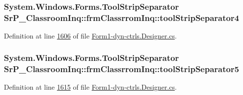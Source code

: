 \hypertarget{class_sr_p___classroom_inq_1_1frm_classrrom_inq_a4b694b6ce3670642d724af5e79c46031}{
\subsubsection[{tool\-Strip\-Separator4}]{\setlength{\rightskip}{0pt plus 5cm}\-System.\-Windows.\-Forms.\-Tool\-Strip\-Separator {\bf \-Sr\-P\-\_\-\-Classroom\-Inq\-::frm\-Classrrom\-Inq\-::tool\-Strip\-Separator4}}}
\label{class_sr_p___classroom_inq_1_1frm_classrrom_inq_a4b694b6ce3670642d724af5e79c46031}


\-Definition at line \hyperlink{_form1-dyn-ctrls_8_designer_8cs_source_l01606}{1606} of file \hyperlink{_form1-dyn-ctrls_8_designer_8cs_source}{\-Form1-\/dyn-\/ctrls.\-Designer.\-cs}.

\hypertarget{class_sr_p___classroom_inq_1_1frm_classrrom_inq_ae8424b2612bda51525d313c05df65bb0}{
\subsubsection[{tool\-Strip\-Separator5}]{\setlength{\rightskip}{0pt plus 5cm}\-System.\-Windows.\-Forms.\-Tool\-Strip\-Separator {\bf \-Sr\-P\-\_\-\-Classroom\-Inq\-::frm\-Classrrom\-Inq\-::tool\-Strip\-Separator5}}}
\label{class_sr_p___classroom_inq_1_1frm_classrrom_inq_ae8424b2612bda51525d313c05df65bb0}


\-Definition at line \hyperlink{_form1-dyn-ctrls_8_designer_8cs_source_l01615}{1615} of file \hyperlink{_form1-dyn-ctrls_8_designer_8cs_source}{\-Form1-\/dyn-\/ctrls.\-Designer.\-cs}.

